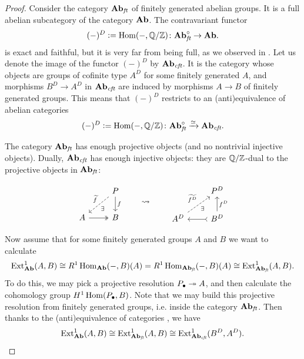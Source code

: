 \begin{proof}
  Consider the category $\text{\bf Ab}_\text{\it ft}$ of finitely generated abelian
  groups. It is a full abelian subcategory of the category $\text{\bf Ab}$.
  The contravariant functor
  $$(-)^D \mathrel{\mathop:}= \operatorname{Hom} (-,\mathbb{Q}/\mathbb{Z})\colon \text{\bf Ab}_\text{\it ft}^\circ \to \text{\bf Ab}.$$
  is exact and faithful, but it is very far from being full, as we observed in
  . Let us denote the image of the functor $(-)^D$ by
  $\text{\bf Ab}_\text{\it cft}$. It is the category whose objects are groups of
  cofinite type $A^D$ for some finitely generated $A$, and morphisms
  $B^D \to A^D$ in $\text{\bf Ab}_\text{\it cft}$ are induced by morphisms
  $A \to B$ of finitely generated groups. This means that $(-)^D$ restricts to
  an (anti)equivalence of abelian categories
  \begin{equation}
    \label{eqn:antiequivalence-of-ft-and-cft}
    (-)^D \mathrel{\mathop:}= \operatorname{Hom} (-,\mathbb{Q}/\mathbb{Z})\colon
    \text{\bf Ab}_\text{\it ft}^\circ \xrightarrow{\simeq} \text{\bf Ab}_\text{\it cft}.
  \end{equation}

  The category $\text{\bf Ab}_\text{\it ft}$ has enough projective objects (and no
  nontrivial injective objects). Dually, $\text{\bf Ab}_\text{\it cft}$ has enough
  injective objects: they are $\mathbb{Q}/\mathbb{Z}$-dual to the projective objects in
  $\text{\bf Ab}_\text{\it ft}$:

  \[ \begin{tikzcd}
      & P \arrow[dashed]{dl}{\exists}[swap]{\widetilde{f}}\arrow{d}{f} \\
      A \arrow[twoheadrightarrow]{r} & B
    \end{tikzcd}
    \quad\quad\rightsquigarrow\quad\quad
    \begin{tikzcd}
      & P^D \\
      A^D\arrow[dashed]{ur}{\widetilde{f^D}}[swap]{\exists} & B^D \arrow{u}[swap]{f^D} \arrow[rightarrowtail]{l}
    \end{tikzcd} \]

  Now assume that for some finitely generated groups $A$ and $B$ we want to
  calculate
  \[ \operatorname{Ext}_{\text{\bf Ab}}^1 (A,B) \cong
    R^1 \operatorname{Hom}_{\text{\bf Ab}} (-,B) (A) =
    R^1 \operatorname{Hom}_{\text{\bf Ab}_\text{\it ft}} (-,B) (A) \cong
    \operatorname{Ext}_{\text{\bf Ab}_\text{\it ft}}^1 (A,B). \]
  To do this, we may pick a projective resolution $P_\bullet \twoheadrightarrow A$, and then
  calculate the cohomology group $H^1 \operatorname{Hom} (P_\bullet,B)$. Note that we may
  build this projective resolution from finitely generated groups, i.e. inside
  the category $\text{\bf Ab}_\text{\it ft}$. Then thanks to the (anti)equivalence
  of categories , we have
  \begin{equation}
    \label{eqn:Ext-Ab-Abft-Abcft}
    \operatorname{Ext}^1_{\text{\bf Ab}} (A,B) \cong
    \operatorname{Ext}^1_{\text{\bf Ab}_\text{\it ft}} (A,B) \cong
    \operatorname{Ext}^1_{\text{\bf Ab}_\text{\it cft}} (B^D,A^D).
  \end{equation}


\end{proof}
